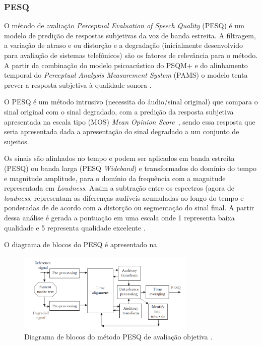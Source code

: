 \subsubsection{PESQ}

O método de avaliação \textit{Perceptual Evaluation of Speech Quality} (PESQ) é um modelo de predição de respostas subjetivas da voz de banda estreita. A filtragem, a variação de atraso e ou distorção e a degradação (inicialmente desenvolvido para avaliação de sistemas telefônicos) são os fatores de relevância para o método. A partir da combinação do modelo psicoacústico do PSQM+ e do alinhamento temporal do \textit{Perceptual Analysis Measurement System} (PAMS) o modelo tenta prever a resposta subjetiva à qualidade sonora \cite{simao2007}. 

O PESQ é um método intrusivo (necessita do áudio/sinal original) que compara o sinal original com o sinal degradado, com a predição da resposta subjetiva apresentada na escala tipo (MOS) \textit{Mean Opinion Score}~\cite{loizou2013speech}, sendo essa resposta que seria apresentada dada a apresentação do sinal degradado a um conjunto de sujeitos.

Os sinais são alinhados no tempo e podem ser aplicados em banda estreita (PESQ) ou banda larga (PESQ \textit{Wideband}) e transformados do domínio do tempo e magnitude amplitude, para o domínio da frequência com a magnitude representada em \textit{Loudness}. Assim a subtração entre os espectros (agora de \textit{loudness}, representam as diferenças audíveis acumuladas ao longo do tempo e ponderadas de de acordo com a distorção ou segmentação do sinal final. A partir dessa análise é gerada a pontuação em uma escala onde 1 representa baixa qualidade e 5 representa qualidade excelente \cite{simao2007}.

O diagrama de blocos do PESQ é apresentado na 

\begin{figure}[H]
\centering
\includegraphics[width=8.5cm]{Figs/PESQ}
\caption[Diagrama de blocos do método PESQ de avaliação objetiva.]{Diagrama de blocos do método PESQ de avaliação objetiva \cite{loizou2013speech}.}
\label{fpesq}
\end{figure}

